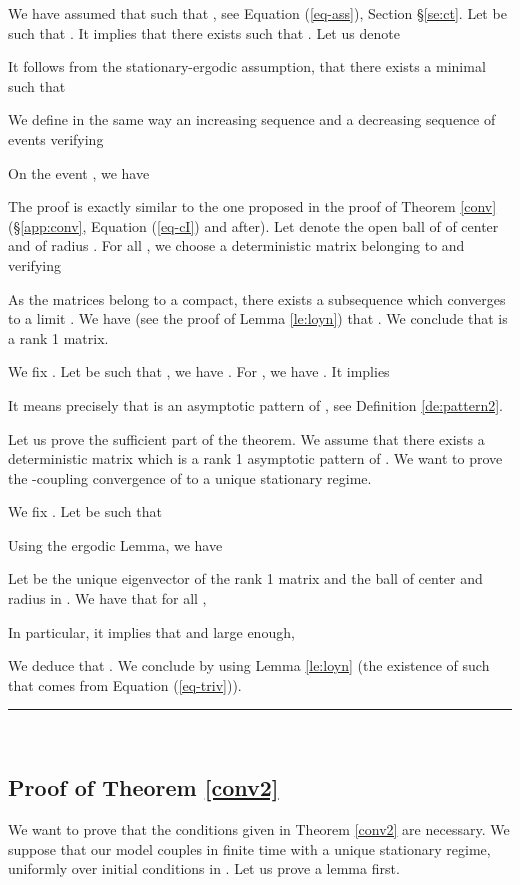 \documentclass[11pt,titlepage]{article}
\def\eref#1{(\ref{#1})}
\newcommand{\parag}{\medskip\noindent}
\newcommand{\cqfd}{\hspace*{\fill}\rule{1.8mm}{1.8mm} \\ }
\begin{document}
We have assumed that 
 such that , see 
Equation \eref{eq-ass}, Section \S \ref{se:ct}. 
Let  be such that . 
It implies that there exists  such that
. 
Let us denote 

It follows from the stationary-ergodic assumption, that there exists 
a minimal  such that

We define in the same way an increasing sequence  and
a decreasing sequence of events  verifying 

On the event , we have 

The proof is exactly similar 
to the one proposed in the proof of Theorem 
\ref{conv} (\S \ref{app:conv}, Equation \eref{eq-cI} and after). 
Let  denote the open ball of  of
center  and of radius . 
For all , we
choose a deterministic matrix  belonging to 
and verifying 

As the matrices  belong to a compact, there exists a
subsequence  which converges to a limit . 
We have (see the proof of Lemma \ref{le:loyn}) that
. We conclude that
 is a rank 1 matrix. 

We fix . Let  be such that , we have
. For , we have
. It implies

It means precisely that  is an asymptotic
pattern of , see Definition \ref{de:pattern2}.



\parag

Let us prove the sufficient part of the theorem. We assume that there exists
a deterministic 
matrix  which is a rank 1 asymptotic pattern of .
We want to prove the -coupling convergence of  to a 
unique stationary regime. 

We fix . Let  be such that 

Using the ergodic Lemma, we have

Let  be the unique eigenvector of the rank 1 matrix 
and 
 the ball of center  and radius  in . 
We have
that for all ,

In particular, it implies that  and  large enough,

We deduce that
. We conclude by using 
Lemma \ref{le:loyn} (the existence of  such that  comes from Equation \eref{eq-triv}).

\cqfd

\subsection{Proof of Theorem \protect\ref{conv2}}
\label{app:conv2}
We want to prove that the conditions given in Theorem \ref{conv2} are
necessary. We suppose that our model couples in finite time with a unique
stationary regime, uniformly over initial
conditions in . 
Let us prove a lemma first.
\end{document}
